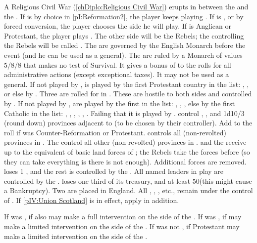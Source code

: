 \phevnt
\aparag A Religious Civil War (\ref{chDiplo:Religious Civil War}) erupts in
\ENG between the \parl and the \paysRoyalists.
\bparag If \ENG is \CATHCR by choice in \ref{pI:Reformation2}, the player
keeps playing \royal.
\bparag If \ENG is \CATHCO, or \CATHCR by forced conversion, the player
chooses the side he will play.
\bparag If \ENG is Anglican or Protestant, the player plays \parl.
\bparag The other side will be the Rebels; the \MAJ controlling the Rebels
will be called \REB.
\bparag\label{pIV:ECW:Monarchs} The \royal are governed by the English Monarch
before the event (and he can be used as a general). The \parl are ruled by a
Monarch  of values 5/8/8 that makes no test of Survival.
It gives a bonus of  to the rolls for all administrative actions
(except exceptional taxes). It may not be used as a general.
\aparag If not played by \ENG, \parl is played by the first Protestant country
in the list: \HOL, \FRA, \SUE or else by \POL.
\aparag Three \REVOLT are rolled for in \ENG. These \REVOLT are hostile to
both sides and controlled by \TUR.
\aparag If not played by \ENG, \royal are played by the first \CATHCR \MAJ in
the list: \SPA, \FRA, \HOL, \VEN else by the first Catholic \MAJ in the list:
\SPA, \FRA, \VEN, \SUE, \POR, \POL.  Failing that it is played by \RUS.
\bparag \royal control \provinceMidlands, \provinceCornwall, \provinceDurham
and 1d10/3 (round down) provinces adjacent to \provinceMidlands (to be chosen
by their controller). Add  to the roll if \ENG was
Counter-Reformation or Protestant. \royal controls all (non-revolted)
provinces in \regionIrlande.
\bparag The \parl control all other (non-revolted) provinces in \ENG.
\bparag \royal and the \parl receive up to the equivalent of basic land forces
of \ENG; the Rebels take the forces before (so they can take everything is
there is not enough). Additional forces are removed.
\bparag \ENG loses 1 \ND, and the rest is controlled by the \parl.
\bparag All named leaders in play are controlled by the \parl.
\bparag \ENG loses one-third of its treasury, and at least 50\ducats (this
might cause a Bankruptcy).
\bparag Two \PIRATE\faceplus are placed in \CTZ England.
\bparag All \TP, \COL, \TradeFLEET, etc., remain under the control of \ENG.
\aparag If \ref{pIV:Union Scotland} is in effect, apply  in addition.

\phdipl
\aparag If \ENG was \CATHCR, \SPA if also \CATHCR may make a full intervention
on the side of the \royal.
\aparag If \ENG was \PROTANG, \SPA if \CATHCR may make a limited intervention
on the side of the \royal.
\aparag If \ENG was not \CATHCR, \HOL if Protestant may make a limited
intervention on the side of the \parl.

